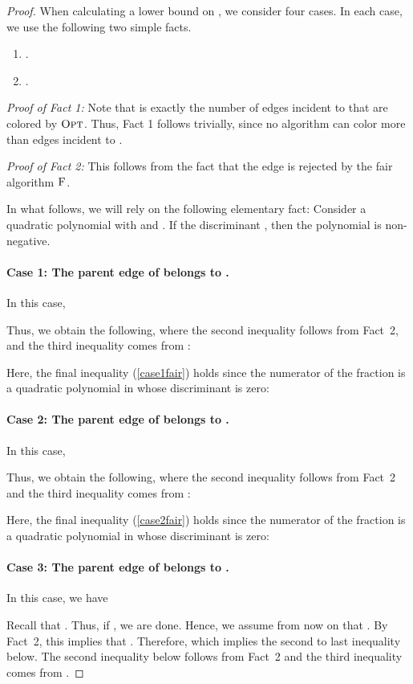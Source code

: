 \documentclass[smallextended]{svjour3}
\newcommand{\OPT}{\ensuremath{\operatorname{\textsc{Opt}}}\xspace}
\newcommand{\FAIR}{\ensuremath{\operatorname{\textsc{F}}}\xspace}
\begin{document}
\begin{proof}
When calculating a lower bound on , we consider four cases.
In each case, we use the following two simple facts.

\begin{enumerate}[Fact 1:]
\item[Fact 1:] .
\item[Fact 2:] .
\end{enumerate}

{\em Proof of Fact 1:}
Note that  is exactly the number of edges incident to  that are colored by \OPT.
Thus, Fact 1 follows trivially, since no algorithm can color more than  edges incident to .

{\em Proof of Fact 2:}
This follows from the fact that the edge  is rejected by the fair algorithm \FAIR.

In what follows, we will rely on the following elementary fact:
Consider a quadratic polynomial  with  and .
If the discriminant , then the polynomial is non-negative.

\paragraph{Case 1: The parent edge of  belongs to .} 
In this case,

Thus, we obtain the following, where the second inequality follows from Fact~2, and the third inequality comes from :

Here, the final inequality (\ref{case1fair}) holds since the numerator of the fraction is a quadratic polynomial in  whose discriminant is zero:
 

\paragraph{Case 2: The parent edge of  belongs to .} 
In this case,

Thus, we obtain the following, where the second inequality follows from Fact~2 and the third inequality comes from :

Here, the final inequality (\ref{case2fair}) holds since the numerator of the fraction is a quadratic polynomial in  whose discriminant is zero: 


\paragraph{Case 3: The parent edge of  belongs to .} 
In this case, we have 
 
Recall that . Thus, if , we are done. Hence, we assume from now on that . By Fact~2, this implies that .
Therefore,  which implies the second to last inequality below. The second inequality below follows from Fact~2 and the third inequality comes from .


\end{proof}
\end{document}
